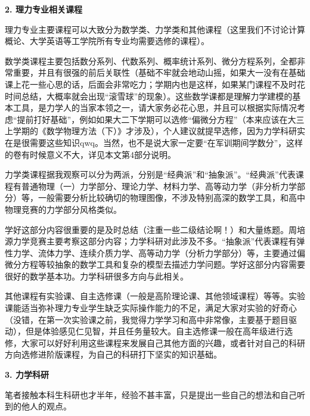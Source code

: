 \textbf{2. 理力专业相关课程}

理力专业主要课程可以大致分为数学类、力学类和其他课程（这里我们不讨论计算概论、大学英语等工学院所有专业均需要选修的课程）。

\vspace{10pt}

数学类课程主要包括数分系列、代数系列、概率统计系列、微分方程系列，全都非常重要，并且有很强的前后关联性（基础不牢就会地动山摇，如果大一没有在基础课上花一些心思的话，后面会非常吃力；学期内也是这样，如果某门课程不及时花时间总结，大概率就会出现“滚雪球”的现象）。这些数学课都是理解力学建模的基本工具，是力学人的当家本领之一，请大家务必花心思，并且可以根据实际情况考虑“提前打好基础”，例如如果大二下学期可以选修“偏微分方程”（本来应该在大三上学期的《数学物理方法（下）》才涉及），个人建议就提早选修，因为力学科研实在是很需要这些知识qwq。当然，也不是说大家一定要“在军训期间学数分”，这样的卷有时候意义不大，详见本文第4部分说明。

\vspace{10pt}

力学类课程据我观察可以分为两派，分别是“经典派”和“抽象派”。“经典派”代表课程有普通物理（一）力学部分、理论力学、材料力学、高等动力学（非分析力学部分）等，一般需要分析比较确切的物理图像，不涉及特别高深的数学工具，和高中物理竞赛的力学部分风格类似。

\vspace{10pt}

学好这部分内容很重要的是及时总结（注重一些二级结论啊！）和大量练题。周培源力学竞赛主要考察这部分内容；力学科研对此涉及不多。“抽象派”代表课程有弹性力学、流体力学、连续介质力学、高等动力学（分析力学部分）等，主要通过偏微分方程等较抽象的数学工具和复杂的模型去描述力学问题。学好这部分内容需要很好的数学基本功。力学科研很多方向与此相关。

\vspace{10pt}

其他课程有实验课、自主选修课（一般是高阶理论课、其他领域课程）等等。实验课能适当弥补理力专业学生缺乏实际操作能力的不足，满足大家对实验的好奇心（没错，在第一次实验课之前，我觉得力学学习和高中非常像，主要基于题目驱动），但是体验感见仁见智，并且任务量较大。自主选修课一般在高年级进行选修，大家可以好好利用这些课程来发展自己其他方面的兴趣，或者针对自己的科研方向选修进阶版课程，为自己的科研打下坚实的知识基础。

\vspace{10pt}

\textbf{3. 力学科研}

笔者接触本科生科研也才半年，经验不甚丰富，只是提出一些自己的想法和自己听到的他人的观点。

